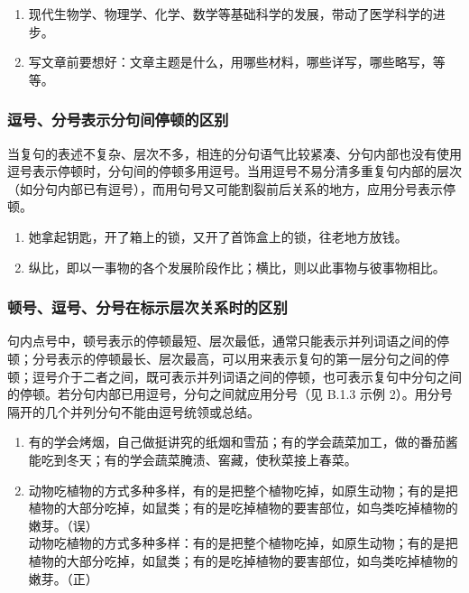 \documentclass[a4paper]{article}
\begin{document}
\begin{enumerate}
    \item 现代生物学、物理学、化学、数学等基础科学的发展，带动了医学科学的进步。
    \item 写文章前要想好：文章主题是什么，用哪些材料，哪些详写，哪些略写，等等。
\end{enumerate}

\subsubsection{逗号、分号表示分句间停顿的区别}

当复句的表述不复杂、层次不多，相连的分句语气比较紧凑、分句内部也没有使用逗号表示停顿时，分句间的停顿多用逗号。当用逗号不易分清多重复句内部的层次（如分句内部已有逗号），而用句号又可能割裂前后关系的地方，应用分号表示停顿。

\begin{enumerate}
    \item 她拿起钥匙，开了箱上的锁，又开了首饰盒上的锁，往老地方放钱。
    \item 纵比，即以一事物的各个发展阶段作比；横比，则以此事物与彼事物相比。
\end{enumerate}

\subsubsection{顿号、逗号、分号在标示层次关系时的区别}

句内点号中，顿号表示的停顿最短、层次最低，通常只能表示并列词语之间的停顿；分号表示的停顿最长、层次最高，可以用来表示复句的第一层分句之间的停顿；逗号介于二者之间，既可表示并列词语之间的停顿，也可表示复句中分句之间的停顿。若分句内部已用逗号，分句之间就应用分号（见 B.1.3 示例 2）。用分号隔开的几个并列分句不能由逗号统领或总结。

\begin{enumerate}
    \item 有的学会烤烟，自己做挺讲究的纸烟和雪茄；有的学会蔬菜加工，做的番茄酱能吃到冬天；有的学会蔬菜腌渍、窖藏，使秋菜接上春菜。
    \item 动物吃植物的方式多种多样，有的是把整个植物吃掉，如原生动物；有的是把植物的大部分吃掉，如鼠类；有的是吃掉植物的要害部位，如鸟类吃掉植物的嫩芽。（误）\\动物吃植物的方式多种多样：有的是把整个植物吃掉，如原生动物；有的是把植物的大部分吃掉，如鼠类；有的是吃掉植物的要害部位，如鸟类吃掉植物的嫩芽。（正）
\end{enumerate}
\end{document}
